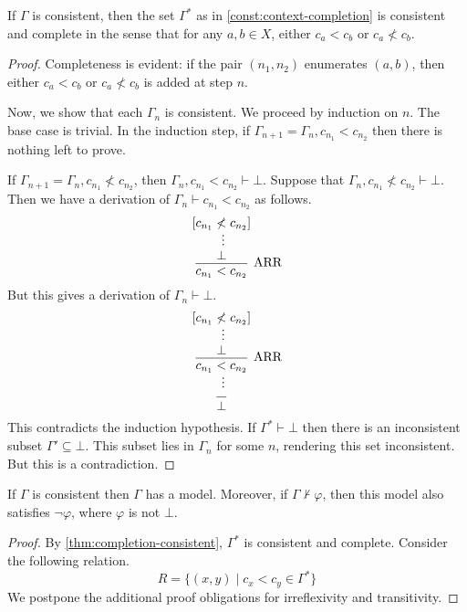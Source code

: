 \documentclass[a4paper]{article}
\begin{document}
\begin{enumerate}
  \begin{lemma}\label{thm:completion-consistent}
    If $\Gamma$ is consistent, then the set $\Gamma^*$ as in \cref{const:context-completion} is consistent and complete in the sense that for any $a,b \in X$, either $c_{a} < c_{b}$ or $c_{a} \nless c_{b}$.
  \end{lemma}
  \begin{proof}
    Completeness is evident: if the pair $(n_1, n_2)$ enumerates $(a,b)$, then either $c_a < c_b$ or $c_a \nless c_b$ is added at step $n$.

    Now, we show that each $\Gamma_{n}$ is consistent.
    We proceed by induction on $n$.
    The base case is trivial.
    In the induction step, if $\Gamma_{n+1} = \Gamma_{n},c_{n_1} < c_{n_2}$ then there is nothing left to prove.

    If $\Gamma_{n+1} = \Gamma_{n},c_{n_1} \nless c_{n_2}$, then $\Gamma_{n},c_{n_1} < c_{n_2} \vdash \bot$.
    Suppose that $\Gamma_{n},c_{n_1} \nless c_{n_2} \vdash \bot$.
    Then we have a derivation of $\Gamma_{n} \vdash c_{n_1} < c_{n_2}$ as follows.
    \[
      \begin{prooftree}
        \hypo{[c_{n_1} \nless c_{n_2}]}
        \ellipsis{}{\bot}
        \infer1[ARR]{c_{n_1} < c_{n_2}}
      \end{prooftree}
    \]
    But this gives a derivation of $\Gamma_{n} \vdash \bot$.
    \[
      \begin{prooftree}
        \hypo{[c_{n_1} \nless c_{n_2}]}
        \ellipsis{}{\bot}
        \infer1[ARR]{c_{n_1} < c_{n_2}}
        \ellipsis{}{}
        \infer1{\bot}
      \end{prooftree}
    \]
    This contradicts the induction hypothesis.
    If $\Gamma^* \vdash \bot$ then there is an inconsistent subset $\Gamma' \subseteq \bot$.
    This subset lies in $\Gamma_{n}$ for some $n$, rendering this set inconsistent.
    But this is a contradiction.
  \end{proof}
  
  \begin{lemma}\label{thm:model-existence}
    If $\Gamma$ is consistent then $\Gamma$ has a model.
    Moreover, if $\Gamma \nvdash \varphi$, then this model also satisfies $\lnot\varphi$, where $\varphi$ is not $\bot$.
  \end{lemma}
  \begin{proof}
    By \cref{thm:completion-consistent}, $\Gamma^*$ is consistent and complete.
    Consider the following relation.
    \[
      R = \{(x,y) \mid c_{x} < c_{y} \in \Gamma^{*}\}
    \]
    We postpone the additional proof obligations for irreflexivity and transitivity.


\end{proof}
\end{enumerate}
\end{document}
